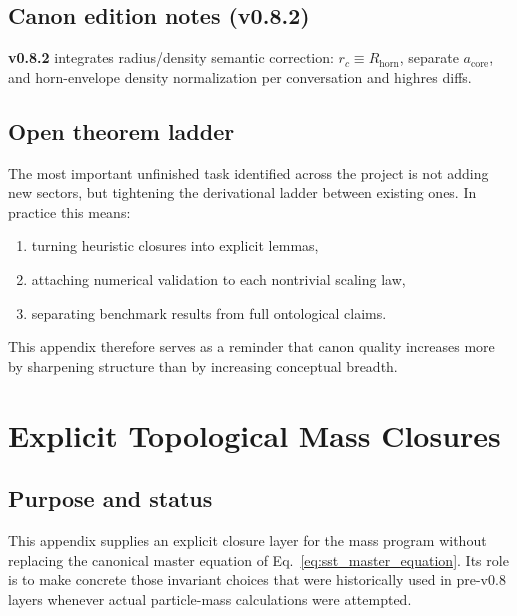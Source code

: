 \documentclass[11pt]{article}
\theoremstyle{definition}
\theoremstyle{plain}
\theoremstyle{remark}
\newcommand{\rc}{{r_c}}
\begin{document}
        \subsection{Canon edition notes (v0.8.2)}
            \textbf{v0.8.2} integrates radius/density semantic correction: $\rc \equiv R_{\mathrm{horn}}$, separate $a_{\mathrm{core}}$, and horn-envelope density normalization per conversation and highres diffs.


        \subsection{Open theorem ladder}
            The most important unfinished task identified across the project is not adding new sectors, but tightening the derivational ladder between existing ones. In practice this means:
            \begin{enumerate}
                \item turning heuristic closures into explicit lemmas,
                \item attaching numerical validation to each nontrivial scaling law,
                \item separating benchmark results from full ontological claims.
            \end{enumerate}
            This appendix therefore serves as a reminder that canon quality increases more by sharpening structure than by increasing conceptual breadth.

 
        \newpage
    
    
    \section{Explicit Topological Mass Closures}
    \label{sec:appendix_explicit_mass}
    
    \subsection{Purpose and status}
        This appendix supplies an explicit closure layer for the mass program without replacing the canonical master equation of Eq.~\eqref{eq:sst_master_equation}. Its role is to make concrete those invariant choices that were historically used in pre-v0.8 layers whenever actual particle-mass calculations were attempted.
        
\end{document}
